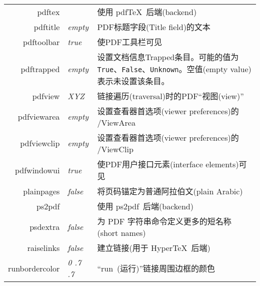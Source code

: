 \documentclass{article}
\begin{document}
\begin{longtable}{@{}>{\ttfamily}rlp{7cm}@{}}
  pdftex                              &                        & 使用 \textsf{pdf\TeX}\ 后端(backend)                                                                \\
  pdftitle                            & \textit{empty}         & PDF标题字段(Title field)的文本                                                                         \\
  pdftoolbar                          & \textit{true}          & 使PDF工具栏可见                                                                                       \\
  pdftrapped                          & \textit{empty}         & 设置文档信息Trapped条目。可能的值为 \texttt{True}、\texttt{False}、\texttt{Unknown}。空值(empty value)表示未设置该条目。    \\
  pdfview                             & \textit{XYZ}           & 链接遍历(traversal)时的PDF“视图(view)”                                                                  \\
  pdfviewarea                         & \textit{empty}         & 设置查看器首选项(viewer preferences)的 /ViewArea                                                         \\
  pdfviewclip                         & \textit{empty}         & 设置查看器首选项(viewer preferences)的 /ViewClip                                                         \\
  pdfwindowui                         & \textit{true}          & 使PDF用户接口元素(interface elements)可见                                                                \\
  plainpages                          & \textit{false}         & 将页码锚定为普通阿拉伯文(plain Arabic)                                                                      \\
  ps2pdf                              &                        & 使用 \textsf{ps2pdf}\ 后端(backend)                                                                 \\
  psdextra                            & \textit{false}         & 为 PDF 字符串命令定义更多的短名称(short names)                                                                \\
  raiselinks                          & \textit{false}         & 建立链接(用于 \textsf{Hyper\TeX}\ 后端)                                                                 \\
  runbordercolor                      & \textit{0 .7 .7}       & “run~(运行)”链接周围边框的颜色                                                                             \\

\end{longtable}
\end{document}
